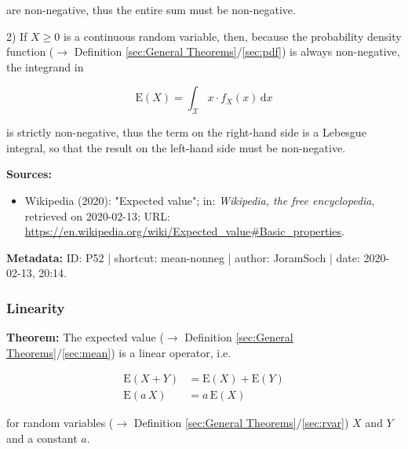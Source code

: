 \documentclass[a4paper,12pt,twoside]{book}
\begin{document}
are non-negative, thus the entire sum must be non-negative.

\vspace{1em}
2) If $X \geq 0$ is a continuous random variable, then, because the probability density function ($\rightarrow$ Definition \ref{sec:General Theorems}/\ref{sec:pdf}) is always non-negative, the integrand in

\begin{equation} \label{eq:mean-nonneg-mean-cont}
\mathrm{E}(X) = \int_{\mathcal{X}} x \cdot f_X(x) \, \mathrm{d}x
\end{equation}

is strictly non-negative, thus the term on the right-hand side is a Lebesgue integral, so that the result on the left-hand side must be non-negative.


\vspace{1em}
\textbf{Sources:}
\begin{itemize}
\item Wikipedia (2020): "Expected value"; in: \textit{Wikipedia, the free encyclopedia}, retrieved on 2020-02-13; URL: \url{https://en.wikipedia.org/wiki/Expected_value#Basic_properties}.
\end{itemize}


\vspace{1em}
\textbf{Metadata:} ID: P52 | shortcut: mean-nonneg | author: JoramSoch | date: 2020-02-13, 20:14.
\vspace{1em}



\subsubsection[\textbf{Linearity}]{Linearity} \label{sec:mean-lin}
\setcounter{equation}{0}

\textbf{Theorem:} The expected value ($\rightarrow$ Definition \ref{sec:General Theorems}/\ref{sec:mean}) is a linear operator, i.e.

\begin{equation} \label{eq:mean-lin-mean-lin}
\begin{split}
\mathrm{E}(X + Y) &= \mathrm{E}(X) + \mathrm{E}(Y) \\
\mathrm{E}(a\,X) &= a\,\mathrm{E}(X)
\end{split}
\end{equation}

for random variables ($\rightarrow$ Definition \ref{sec:General Theorems}/\ref{sec:rvar}) $X$ and $Y$ and a constant $a$.
\end{document}
